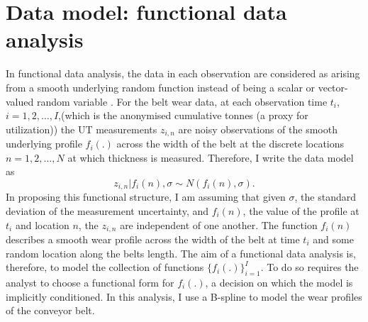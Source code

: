 \section{Data model: functional data analysis} \label{sec:belt-wear-fda}
In functional data analysis, the data in each observation are considered as arising from a smooth underlying random function instead of being a scalar or vector-valued random variable \citep[p.~512]{BDA2020}. 
For the belt wear data, at each observation time $t_i$, $i = 1, 2, \dots, I$,(which is the anonymised cumulative tonnes (a proxy for utilization)) the UT measurements $z_{i,n}$ are noisy observations of the smooth underlying profile $f_i(.)$ across the width of the belt at the discrete locations $n = 1, 2, \dots, N$ at which thickness is measured. Therefore, I write the data model as
\begin{equation}
  z_{i, n}|f_i(n),\sigma \sim N(f_i(n), \sigma).
  \label{eq:fda}
\end{equation}
In proposing this functional structure, I am assuming that given $\sigma$, the standard deviation of the measurement uncertainty, and $f_i(n)$, the value of the profile at $t_i$ and location $n$, the $z_{i,n}$ are independent of one another. The function $f_i(n)$ describes a smooth wear profile across the width of the belt at time $t_i$ and some random location along the belts length. The aim of a functional data analysis is, therefore, to model the collection of functions $\{f_i(.)\}^I_{i = 1}$. To do so requires the analyst to choose a functional form for $f_i(.)$, a decision on which the model is implicitly conditioned. In this analysis, I use a B-spline to model the wear profiles of the conveyor belt.

